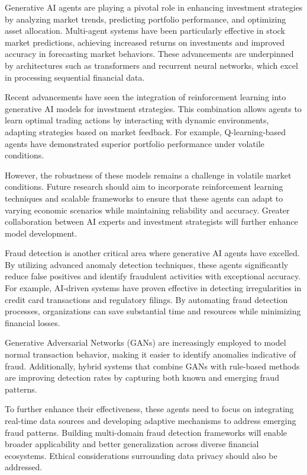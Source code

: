 \documentclass[a4paper,headinclude=on,footinclude=on,12pt,oneside]{scrbook}
\begin{document}
	
	Generative AI agents are playing a pivotal role in enhancing investment strategies by analyzing market trends, predicting portfolio performance, and optimizing asset allocation. Multi-agent systems have been particularly effective in stock market predictions, achieving increased returns on investments and improved accuracy in forecasting market behaviors. These advancements are underpinned by architectures such as transformers and recurrent neural networks, which excel in processing sequential financial data.
	
	Recent advancements have seen the integration of reinforcement learning into generative AI models for investment strategies. This combination allows agents to learn optimal trading actions by interacting with dynamic environments, adapting strategies based on market feedback. For example, Q-learning-based agents have demonstrated superior portfolio performance under volatile conditions.
	
	However, the robustness of these models remains a challenge in volatile market conditions. Future research should aim to incorporate reinforcement learning techniques and scalable frameworks to ensure that these agents can adapt to varying economic scenarios while maintaining reliability and accuracy. Greater collaboration between AI experts and investment strategists will further enhance model development.
	
	
	Fraud detection is another critical area where generative AI agents have excelled. By utilizing advanced anomaly detection techniques, these agents significantly reduce false positives and identify fraudulent activities with exceptional accuracy. For example, AI-driven systems have proven effective in detecting irregularities in credit card transactions and regulatory filings. By automating fraud detection processes, organizations can save substantial time and resources while minimizing financial losses.
	
	Generative Adversarial Networks (GANs) are increasingly employed to model normal transaction behavior, making it easier to identify anomalies indicative of fraud. Additionally, hybrid systems that combine GANs with rule-based methods are improving detection rates by capturing both known and emerging fraud patterns.
	
	To further enhance their effectiveness, these agents need to focus on integrating real-time data sources and developing adaptive mechanisms to address emerging fraud patterns. Building multi-domain fraud detection frameworks will enable broader applicability and better generalization across diverse financial ecosystems. Ethical considerations surrounding data privacy should also be addressed.
	
\end{document}
